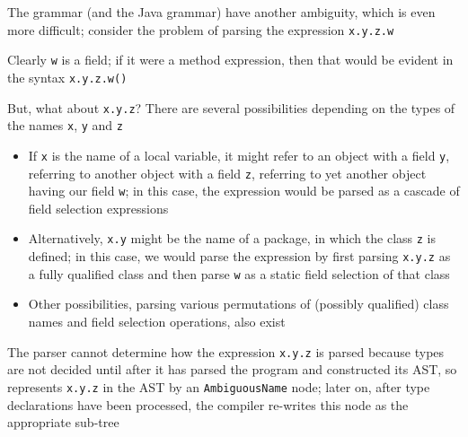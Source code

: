 \documentclass[8pt,a4paper,compress]{beamer}
\begin{document}
\begin{frame}[fragile]
\pause

The \jmm grammar (and the Java grammar) have another ambiguity, which is even more difficult; consider the problem of parsing the expression \lstinline{x.y.z.w}

\pause
\bigskip

Clearly \lstinline{w} is a field; if it were a method expression, then that would be evident in the syntax \lstinline{x.y.z.w()}

\pause
\bigskip

But, what about \lstinline{x.y.z}?  There are several possibilities depending on the types of the names \lstinline{x}, \lstinline{y} and \lstinline{z}

\begin{itemize}
\item If \lstinline{x} is the name of a local variable, it might refer to an object with a field \lstinline{y}, referring to another object with a field \lstinline{z}, referring to yet another object having our field \lstinline{w}; in this case, the expression would be parsed as a cascade of field selection expressions

\item Alternatively, \lstinline{x.y} might be the name of a package, in which the class \lstinline{z} is defined; in this case, we would parse the expression by first parsing \lstinline{x.y.z} as a fully qualified class and then parse \lstinline{w} as a static field selection of that class

\item Other possibilities, parsing various permutations of (possibly qualified) class names and field selection operations, also exist
\end{itemize}

\pause
\bigskip

The parser cannot determine how the expression \lstinline{x.y.z} is parsed because types are not decided until after it has parsed the program and constructed its AST, so represents \lstinline{x.y.z} in the AST by an \lstinline{AmbiguousName} node; later on, after type declarations have been processed, the compiler re-writes this node as the appropriate sub-tree
\end{frame}
\end{document}
